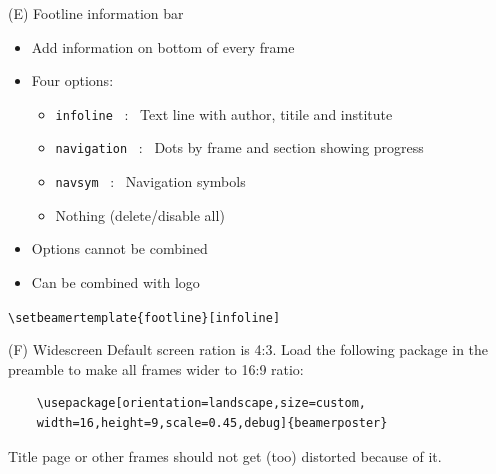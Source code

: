 \documentclass[10pt,t]{beamer}
\begin{document}
\begin{frame}[fragile]{(E) Footline information bar}
\begin{itemize}
    \item Add information on bottom of every frame
    \item Four options:
    \begin{itemize}
        \item \verb+infoline+ ~:~ Text line with author, titile and institute
        \item \verb+navigation+  ~:~ Dots by frame and section showing progress
        \item \verb+navsym+  ~:~ Navigation symbols
        \item Nothing (delete/disable all)
    \end{itemize}
    \smallskip
    \item Options cannot be combined
    \item Can be combined with logo
    
\end{itemize}

\medskip
\verb+\setbeamertemplate{footline}[+{\color{red}\verb+infoline+}\verb+]+
\end{frame}






\begin{frame}[fragile]{(F) Widescreen}
	Default screen ration is 4:3.  Load the following package in the preamble to make all frames wider to 16:9 ratio:
	
	\begin{verbatim}
	\usepackage[orientation=landscape,size=custom,
	width=16,height=9,scale=0.45,debug]{beamerposter} 
	\end{verbatim}
	
	Title page or other frames should not get (too) distorted because of it. 
\end{frame}
\end{document}
